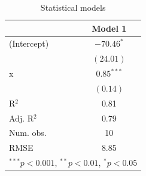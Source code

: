 \documentclass[14pt,aspectratio=1610]{beamer}
\begin{document}

\begin{frame}{}
\frametitle{ }
\begin{block}{}
\begin{table}
\begin{center}
\begin{tabular}{lc}
\hline
 & Model 1 \\
\hline
(Intercept) & $-70.46^{*}$ \\
            & $(24.01)$    \\
x           & $0.85^{***}$ \\
            & $(0.14)$     \\
\hline
R$^2$       & 0.81         \\
Adj. R$^2$  & 0.79         \\
Num. obs.   & 10           \\
RMSE        & 8.85         \\
\hline
\multicolumn{2}{l}{\scriptsize{$^{***}p<0.001$, $^{**}p<0.01$, $^*p<0.05$}}
\end{tabular}
\caption{Statistical models}
\label{table:coefficients}
\end{center}
\end{table} 
\end{block}
\end{frame}
\end{document}
